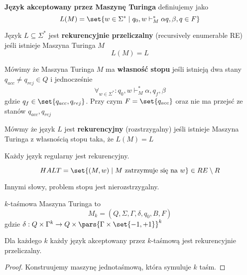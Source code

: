 \begin{definition}
    \textbf{Język akceptowany przez Maszynę Turinga} definiujemy jako
    \[
        L(M) = \set{w \in \Sigma^* \mid q_0, w\vdash_M^* \alpha q, \beta, q \in F}
    \]
\end{definition}

\begin{definition}
    Język \( L \subseteq \Sigma^* \) jest \textbf{rekurencyjnie przeliczalny} (recursively enumerable RE) jeśli istnieje Maszyna Turinga \( M \)
    \[
        L(M) = L
    \]
\end{definition}

\begin{definition}
    Mówimy że Maszyna Turinga  \( M \) ma \textbf{własność stopu} jeśli istnieją dwa stany \( q_{acc} \neq q_{rej} \in Q \)
    i jednocześnie \[
        \forall_{w \in \Sigma^*} : q_0, w \vdash_M^* \alpha, q_f, \beta
    \]
    gdzie \( q_f \in \set{q_{acc}, q_{rej}} \).
    Przy czym \( F = \set{q_{acc}} \) oraz nie ma przejsć ze stanów \( q_{acc}, q_{rej} \)
\end{definition}

\begin{definition}
    Mówmy że język \( L \) jest \textbf{rekurencyjny} (rozstrzygalny) jeśli istnieje Maszyna Turinga z własnością stopu taka, że
    \( L(M) = L \)
\end{definition}

\begin{lemma}
    Każdy język regularny jest rekurencyjny.
\end{lemma}
\begin{lemma}
    \[
        HALT = \set{
            (M, w) \mid 
            M \text{ zatrzymuje się na } w
        } \in RE \setminus R
    \]
\end{lemma}
Innymi słowy, problem stopu jest nierozstrzygalny.

\begin{definition}
    \(k\)-taśmowa Maszyna Turinga to 
    \[
        M_k = (Q, \Sigma, \Gamma, \delta, q_0, B, F)
    \]
    gdzie
    \( \delta : Q \times \Gamma^k \rightarrow Q \times \pars{\Gamma \times \set{-1, +1}}^k\)
\end{definition}

\begin{theorem}
    Dla każdego \( k \) każdy język akceptowany przez \(k\)-taśmową jest rekurencyjnie przeliczalny.
\end{theorem}
\begin{proof}
    Konstruujemy maszynę jednotaśmową, która symuluje \(k\) taśm.
\end{proof}

